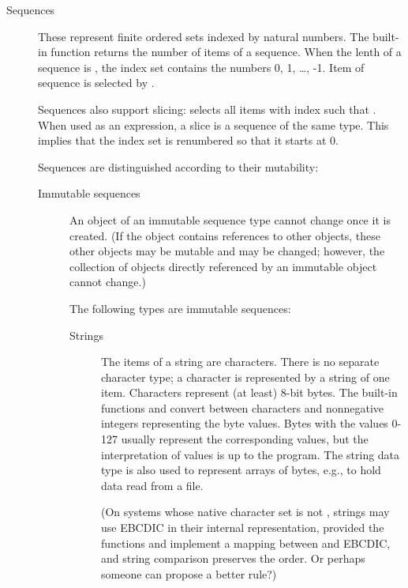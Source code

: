\begin{description}
\begin{description}
\end{description} %

\item[Sequences]
These represent finite ordered sets indexed by natural numbers.
The built-in function  returns the
number of items of a sequence.
When the lenth of a sequence is , the
index set contains the numbers 0, 1, \ldots, -1.  Item
 of sequence  is selected by .

Sequences also support slicing: 
selects all items with index  such that  \code{<=}
 \code{<} .  When used as an expression, a slice is a
sequence of the same type.  This implies that the index set is
renumbered so that it starts at 0.

Sequences are distinguished according to their mutability:

\begin{description}
%
\item[Immutable sequences]
An object of an immutable sequence type cannot change once it is
created.  (If the object contains references to other objects,
these other objects may be mutable and may be changed; however,
the collection of objects directly referenced by an immutable object
cannot change.)

The following types are immutable sequences:

\begin{description}

\item[Strings]
The items of a string are characters.  There is no separate
character type; a character is represented by a string of one item.
Characters represent (at least) 8-bit bytes.  The built-in
functions  and
 convert between characters and
nonnegative integers representing the byte values.  Bytes with the
values 0-127 usually represent the corresponding \ASCII{} values, but
the interpretation of values is up to the program.  The string
data type is also used to represent arrays of bytes, e.g., to hold data
read from a file.

(On systems whose native character set is not \ASCII{}, strings may use
EBCDIC in their internal representation, provided the functions
 and  implement a mapping between \ASCII{} and
EBCDIC, and string comparison preserves the \ASCII{} order.
Or perhaps someone can propose a better rule?)


\end{description}
\end{description}
\end{description}
